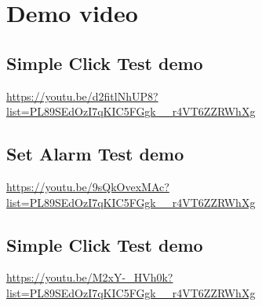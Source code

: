 \chapter{Demo video}
\label{ch:droid_setup}
\section{Simple Click Test demo}
\url{https://youtu.be/d2fitlNhUP8?list=PL89SEdOzI7qKIC5FGgk__r4VT6ZZRWhXg}

\section{Set Alarm Test demo}
\url{https://youtu.be/9sQkOvexMAc?list=PL89SEdOzI7qKIC5FGgk__r4VT6ZZRWhXg}

\section{Simple Click Test demo}
\url{https://youtu.be/M2xY-_HVh0k?list=PL89SEdOzI7qKIC5FGgk__r4VT6ZZRWhXg}

